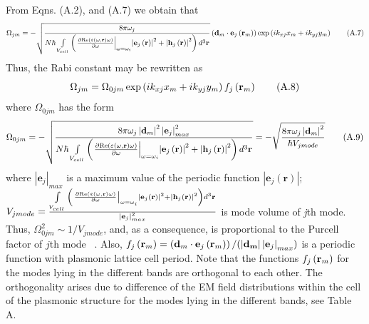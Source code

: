 \documentclass[aps,prapplied,amsmath,amssymb,onecolumn,superscriptaddress,showpacs,floatfix,longbibliography]{revtex4-1}
\begin{document}
From Eqns. (A.2), and (A.7) we obtain that
\begin{equation}
{\Omega _{jm}} =-\sqrt{\frac{{8\pi \omega _j}}{{N \hbar} \int\limits_{{V_{cell}}} {\left( {{{\left. {\frac{{\partial {\mathop{\rm Re}\nolimits} \left( {\varepsilon(\omega, \textbf{r}) \omega } \right)}}{{\partial \omega }}} \right|}_{\omega  = {\omega _i}}}{{\left| {{{\bf{e}}_j}\left( {\bf{r}} \right)} \right|}^2} + {{\left| {{{\bf{h}}_j}\left( {\bf{r}} \right)} \right|}^2}} \right){d^3}{\bf{r}}}}} \left( {{{\bf{d}}_m} \cdot {{\bf{e}}_j}\left( {{{\bf{r}}_m}} \right)} \right)\exp \left( {i{k_{xj}}{x_m} + i{k_{yj}}{y_m}} \right) \tag{A.7}
\end{equation}
Thus, the Rabi constant may be rewritten as
\begin{equation}
{\Omega _{jm}} = {\Omega _{0jm}}\exp \left( {i{k_{xj}}{x_m} + i{k_{yj}}{y_m}} \right){f_j}\left( {{{\bf{r}}_m}} \right) \tag{A.8}
\end{equation}
where $\Omega _{0jm}$ has the form
\begin{equation}
{\Omega _{0jm}} =-\sqrt{\frac{{8\pi \omega _j \left|\textbf{d}_m\right|^2 \left|\textbf{e}_{j}\right|_{max}^2}}{{N \hbar} \int\limits_{{V_{cell}}} {\left( {{{\left. {\frac{{\partial {\mathop{\rm Re}\nolimits} \left( {\varepsilon(\omega, \textbf{r}) \omega } \right)}}{{\partial \omega }}} \right|}_{\omega  = {\omega _i}}}{{\left| {{{\bf{e}}_j}\left( {\bf{r}} \right)} \right|}^2} + {{\left| {{{\bf{h}}_j}\left( {\bf{r}} \right)} \right|}^2}} \right){d^3}{\bf{r}}}}} = -\sqrt{\frac{{8\pi \omega _j \left|\textbf{d}_m\right|^2}}{\hbar V_{j mode}}} \tag{A.9}
\end{equation}
where $\left|\textbf{e}_{j}\right|_{max}$ is a maximum value of the periodic function $\left|\textbf{e}_{j}(\textbf{r})\right|$; $V_{j mode}=\frac{\int\limits_{{V_{cell}}} {\left( {{{\left. {\frac{{\partial {\mathop{\rm Re}\nolimits} \left( {\varepsilon(\omega, \textbf{r}) \omega } \right)}}{{\partial \omega }}} \right|}_{\omega  = {\omega _i}}}{{\left| {{{\bf{e}}_j}\left( {\bf{r}} \right)} \right|}^2} + {{\left| {{{\bf{h}}_j}\left( {\bf{r}} \right)} \right|}^2}} \right){d^3}{\bf{r}}}}{\left|\textbf{e}_{j}\right|_{max}^2}$ is mode volume of \textit{j}th mode. Thus, $\Omega_{0jm}^2 \sim 1/V_{jmode}$, and, as a consequence, is proportional to the Purcell factor of $j$th mode ~\cite{ZhouNatNano}.
Also, ${f_j}\left( {{{\bf{r}}_m}} \right) = \left( {{{\bf{d}}_m} \cdot {{\bf{e}}_j}\left( {{{\bf{r}}_m}} \right)} \right)/(\left|\bf{d}_m\right| \left|\textbf{e}_{j}\right|_{max})$ is a periodic function with plasmonic lattice cell period. Note that the functions ${f_j}\left( {{{\bf{r}}_m}} \right)$ for the modes lying in the different bands are orthogonal to each other. The orthogonality arises due to difference of the EM field distributions within the cell of the plasmonic structure for the modes lying in the different bands, see Table A.


\end{document}
